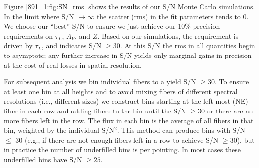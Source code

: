 Figure \ref{891_1:fig:SN_rms} shows the results of our S/N Monte Carlo
simulations. In the limit where S/N $\rightarrow\infty$ the scatter
(rms) in the fit parameters tends to 0.  We choose our ``best'' S/N to
ensure we just achieve our 10\% precision requirements on $\tau_L$,
$A_V$, and $Z$.  Based on our simulations, the requirement is driven
by $\tau_L$, and indicates S/N $\geq 30$.  At this S/N the rms in all
quantities begin to asymptote; any further increase in S/N yields only
marginal gains in precision at the cost of real losses in spatial
resolution.

For subsequent analysis we bin individual \GP fibers to a yield S/N
$\geq 30$. To ensure at least one bin at all heights and to avoid
mixing fibers of different spectral resolutions (i.e., different
sizes) we construct bins starting at the left-most (NE) fiber in each
row and adding fibers to the bin until the S/N $\geq 30$ or there are
no more fibers left in the row. The flux in each bin is the average of
all fibers in that bin, weighted by the individual S/N$^2$. This
method can produce bins with S/N $\leq$ 30 (e.g., if there are not
enough fibers left in a row to achieve S/N $\geq 30$), but in practice
the number of underfilled bins is  per pointing. In most cases
these underfilled bins have S/N $\geq 25$.






